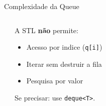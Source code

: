 \documentclass[aspectratio=169,10pt]{beamer}
\begin{document}
\begin{frame}{Complexidade da Queue}
\begin{columns}[c]
\begin{tcolorbox}[caixaAmarelo,title={Stack vs Queue --- mesma eficiencia}]
      \end{tcolorbox}
      \vspace{0.1cm}
      \begin{tcolorbox}[caixaVermelho,title={Limitacoes da Queue}]
        \footnotesize
        A STL \textbf{não} permite:
        \begin{itemize}\footnotesize
          \item Acesso por indice (\texttt{q[i]})
          \item Iterar sem destruir a fila
          \item Pesquisa por valor
        \end{itemize}
        Se precisar: use \texttt{deque<T>}.
      \end{tcolorbox}
  \end{columns}
\end{frame}
\end{document}
